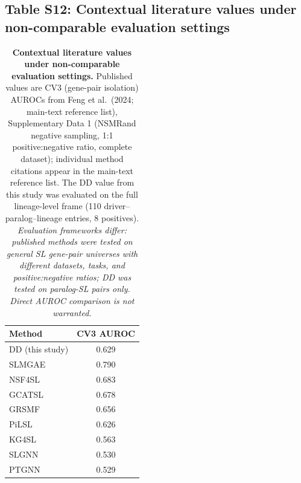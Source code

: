 \documentclass[11pt,a4paper]{article}
\begin{document}
\subsection{Table S12: Contextual literature values under non-comparable evaluation settings}
\setcounter{table}{11}
\begin{table}[H]
\centering
\caption{\textbf{Contextual literature values under non-comparable evaluation settings.} Published values are CV3 (gene-pair isolation) AUROCs from Feng et al.\ (2024; main-text reference list), Supplementary Data 1 (NSMRand negative sampling, 1:1 positive:negative ratio, complete dataset); individual method citations appear in the main-text reference list. The DD value from this study was evaluated on the full lineage-level frame (110 driver--paralog--lineage entries, 8 positives). \textit{Evaluation frameworks differ: published methods were tested on general SL gene-pair universes with different datasets, tasks, and positive:negative ratios; DD was tested on paralog-SL pairs only. Direct AUROC comparison is not warranted.}}
\label{tab:benchmark}
\begin{tabular}{lc}
\toprule
\textbf{Method} & \textbf{CV3 AUROC} \\
\midrule
DD (this study) & 0.629 \\
SLMGAE & 0.790 \\
NSF4SL & 0.683 \\
GCATSL & 0.678 \\
GRSMF & 0.656 \\
PiLSL & 0.626 \\
KG4SL & 0.563 \\
SLGNN & 0.530 \\
PTGNN & 0.529 \\
\bottomrule
\end{tabular}
\end{table}
\end{document}
